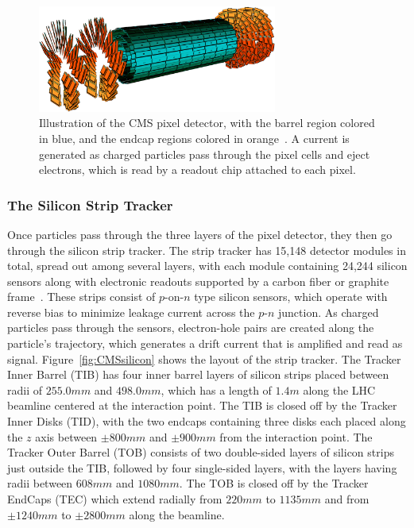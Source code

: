 \begin{figure}[htbp]
  \centering
  \includegraphics[width=0.7\textwidth]{fig/experiment/cms_pixelTracker.pdf}
  \caption[
    Illustration of the CMS pixel detector, with the barrel region colored in blue, and the endcap regions colored in orange.
    A current is generated as charged particles pass through the pixel cells and eject electrons, which is read by a readout chip attached to each pixel.
  ]{
    Illustration of the CMS pixel detector, with the barrel region colored in blue, and the endcap regions colored in orange~\cite{Collaboration_2010_pixel}.
    A current is generated as charged particles pass through the pixel cells and eject electrons, which is read by a readout chip attached to each pixel.
  }
  \label{fig:CMSpixel}
\end{figure}

\subsubsection{The Silicon Strip Tracker}

Once particles pass through the three layers of the pixel detector, they then go through the silicon strip tracker.
The strip tracker has 15,148 detector modules in total, spread out among several layers, with each module containing 24,244 silicon sensors along with electronic readouts supported by a carbon fiber or graphite frame~\cite{TRK-11-001,Phase1Pixel}.
These strips consist of $p$-on-$n$ type silicon sensors, which operate with reverse bias to minimize leakage current across the $p$-$n$ junction.
As charged particles pass through the sensors, electron-hole pairs are created along the particle's trajectory, which generates a drift current that is amplified and read as signal.
Figure~\ref{fig:CMSsilicon} shows the layout of the strip tracker.
The Tracker Inner Barrel (TIB) has four inner barrel layers of silicon strips placed between radii of $255.0\unit{mm}$ and $498.0\unit{mm}$, which has a length of $1.4\unit{m}$ along the LHC beamline centered at the interaction point.
The TIB is closed off by the Tracker Inner Disks (TID), with the two endcaps containing three disks each placed along the $z$ axis between $\pm800\unit{mm}$ and $\pm900\unit{mm}$ from the interaction point.
The Tracker Outer Barrel (TOB) consists of two double-sided layers of silicon strips just outside the TIB, followed by four single-sided layers, with the layers having radii between $608\unit{mm}$ and $1080\unit{mm}$.
The TOB is closed off by the Tracker EndCaps (TEC) which extend radially from $220\unit{mm}$ to $1135\unit{mm}$ and from $\pm1240\unit{mm}$ to $\pm2800\unit{mm}$ along the beamline.


